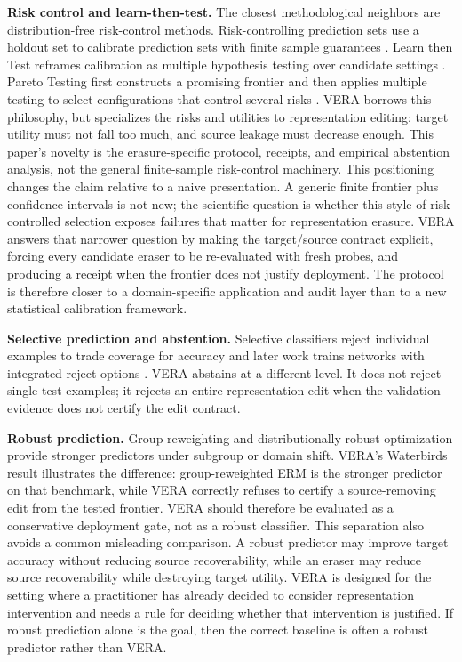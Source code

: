 \documentclass[letterpaper]{article}
\begin{document}
\textbf{Risk control and learn-then-test.} The closest methodological
neighbors are distribution-free risk-control methods. Risk-controlling
prediction sets use a holdout set to calibrate prediction sets with finite
sample guarantees \citep{bates2021rcps}. Learn then Test reframes calibration
as multiple hypothesis testing over candidate settings
\citep{angelopoulos2021ltt}. Pareto Testing first constructs a promising
frontier and then applies multiple testing to select configurations that
control several risks \citep{laufer2022pareto}. VERA borrows this philosophy,
but specializes the risks and utilities to representation editing: target
utility must not fall too much, and source leakage must decrease enough. This
paper's novelty is the erasure-specific protocol, receipts, and empirical
abstention analysis, not the general finite-sample risk-control machinery.
This positioning changes the claim relative to a naive presentation. A generic
finite frontier plus confidence intervals is not new; the scientific question
is whether this style of risk-controlled selection exposes failures that matter
for representation erasure. VERA answers that narrower question by making the
target/source contract explicit, forcing every candidate eraser to be
re-evaluated with fresh probes, and producing a receipt when the frontier does
not justify deployment. The protocol is therefore closer to a domain-specific
application and audit layer than to a new statistical calibration framework.

\textbf{Selective prediction and abstention.} Selective classifiers reject
individual examples to trade coverage for accuracy \citep{geifman2017selective}
and later work trains networks with integrated reject options
\citep{geifman2019selectivenet}. VERA abstains at a different level. It does
not reject single test examples; it rejects an entire representation edit when
the validation evidence does not certify the edit contract.

\textbf{Robust prediction.} Group reweighting and distributionally robust
optimization provide stronger predictors under subgroup or domain shift.
VERA's Waterbirds result illustrates the difference: group-reweighted ERM is
the stronger predictor on that benchmark, while VERA correctly refuses to
certify a source-removing edit from the tested frontier. VERA should therefore
be evaluated as a conservative deployment gate, not as a robust classifier.
This separation also avoids a common misleading comparison. A robust predictor
may improve target accuracy without reducing source recoverability, while an
eraser may reduce source recoverability while destroying target utility. VERA
is designed for the setting where a practitioner has already decided to
consider representation intervention and needs a rule for deciding whether that
intervention is justified. If robust prediction alone is the goal, then the
correct baseline is often a robust predictor rather than VERA.
\end{document}
